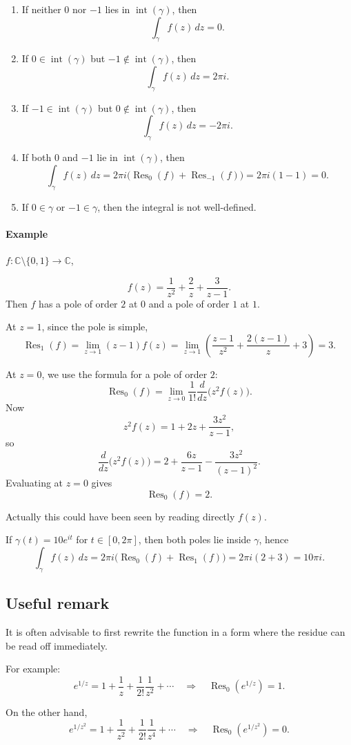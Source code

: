 \begin{enumerate}
    \item If neither $0$ nor $-1$ lies in $\operatorname{int}(\gamma)$, then
    \[
    \int_\gamma f(z)\,dz = 0.
    \]

    \item If $0\in \operatorname{int}(\gamma)$ but $-1\notin \operatorname{int}(\gamma)$, then
    \[
    \int_\gamma f(z)\,dz = 2\pi i.
    \]

    \item If $-1\in \operatorname{int}(\gamma)$ but $0\notin \operatorname{int}(\gamma)$, then
    \[
    \int_\gamma f(z)\,dz = -2\pi i.
    \]

    \item If both $0$ and $-1$ lie in $\operatorname{int}(\gamma)$, then
    \[
    \int_\gamma f(z)\,dz
    =
    2\pi i\big(\operatorname{Res}_0(f)+\operatorname{Res}_{-1}(f)\big)
    =
    2\pi i(1-1)=0.
    \]

    \item If $0\in\gamma$ or $-1\in\gamma$, then the integral is not well-defined.
\end{enumerate}

\paragraph{Example}

$f: \mathbb{C}\setminus \{0,1\} \to \mathbb{C}$,

\[
f(z)=\frac{1}{z^2}+\frac{2}{z}+\frac{3}{z-1}.
\]
Then $f$ has a pole of order $2$ at $0$ and a pole of order $1$ at $1$.

At $z=1$, since the pole is simple,
\[
\operatorname{Res}_1(f)
=
\lim_{z\to 1}(z-1)f(z)
=
\lim_{z\to 1}\left(\frac{z-1}{z^2}+\frac{2(z-1)}{z}+3\right)
=3.
\]

At $z=0$, we use the formula for a pole of order $2$:
\[
\operatorname{Res}_0(f)
= \lim_{z \to 0} \frac{1}{1!}
\frac{d}{dz}\big(z^2 f(z)\big).
\]
Now
\[
z^2 f(z)
=
1+2z+\frac{3z^2}{z-1},
\]
so
\[
\frac{d}{dz}\big(z^2 f(z)\big)
=
2+\frac{6z}{z-1}-\frac{3z^2}{(z-1)^2}.
\]
Evaluating at $z=0$ gives
\[
\operatorname{Res}_0(f)=2.
\]

Actually this could have been seen by reading directly $f(z)$.

If $\gamma(t)=10e^{it}$ for $t\in[0,2\pi]$, then both poles lie inside $\gamma$, hence
\[
\int_\gamma f(z)\,dz
=
2\pi i\big(\operatorname{Res}_0(f)+\operatorname{Res}_1(f)\big)
=
2\pi i(2+3)
=
10\pi i.
\]

\subsection{Useful remark}

It is often advisable to first rewrite the function in a form where the residue can be read off immediately.

For example:
\[
e^{1/z}=1+\frac{1}{z}+\frac{1}{2!}\frac{1}{z^2}+\cdots
\quad\Longrightarrow\quad
\operatorname{Res}_0\!\left(e^{1/z}\right)=1.
\]

On the other hand,
\[
e^{1/z^2}=1+\frac{1}{z^2}+\frac{1}{2!}\frac{1}{z^4}+\cdots
\quad\Longrightarrow\quad
\operatorname{Res}_0\!\left(e^{1/z^2}\right)=0.
\]
